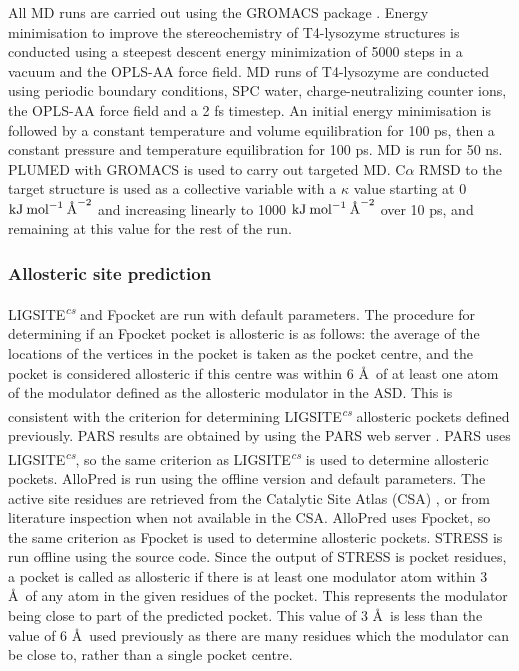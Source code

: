 All MD runs are carried out using the GROMACS package \cite{Abraham2015}.
Energy minimisation to improve the stereochemistry of T4-lysozyme structures is conducted using a steepest descent energy minimization of 5000 steps in a vacuum and the OPLS-AA force field.
MD runs of T4-lysozyme are conducted using periodic boundary conditions, SPC water, charge-neutralizing counter ions, the OPLS-AA force field and a 2 fs timestep.
An initial energy minimisation is followed by a constant temperature and volume equilibration for 100 ps, then a constant pressure and temperature equilibration for 100 ps.
MD is run for 50 ns.
PLUMED \cite{Tribello2014} with GROMACS is used to carry out targeted MD.
C$\alpha$ RMSD to the target structure is used as a collective variable with a $\kappa$ value starting at 0 $\textup{kJ} \: \textup{mol}^{-1} \: \textup{\AA}^{-2}$ and increasing linearly to 1000 $\textup{kJ} \: \textup{mol}^{-1} \: \textup{\AA}^{-2}$ over 10 ps, and remaining at this value for the rest of the run.


\subsubsection{Allosteric site prediction}

LIGSITE\textsuperscript{\it cs} \cite{Huang2006} and Fpocket \cite{LeGuilloux2009} are run with default parameters.
The procedure for determining if an Fpocket pocket is allosteric is as follows: the average of the locations of the vertices in the pocket is taken as the pocket centre, and the pocket is considered allosteric if this centre was within 6 \AA\ of at least one atom of the modulator defined as the allosteric modulator in the ASD.
This is consistent with the criterion for determining LIGSITE\textsuperscript{\it cs} allosteric pockets defined previously.
PARS results are obtained by using the PARS web server \cite{Panjkovich2014}.
PARS uses LIGSITE\textsuperscript{\it cs}, so the same criterion as LIGSITE\textsuperscript{\it cs} is used to determine allosteric pockets.
AlloPred is run using the offline version \cite{Greener2015} and default parameters.
The active site residues are retrieved from the Catalytic Site Atlas (CSA) \cite{Furnham2014}, or from literature inspection when not available in the CSA.
AlloPred uses Fpocket, so the same criterion as Fpocket is used to determine allosteric pockets.
STRESS \cite{Clarke2016} is run offline using the source code.
Since the output of STRESS is pocket residues, a pocket is called as allosteric if there is at least one modulator atom within 3 \AA\ of any atom in the given residues of the pocket.
This represents the modulator being close to part of the predicted pocket.
This value of 3 \AA\ is less than the value of 6 \AA\ used previously as there are many residues which the modulator can be close to, rather than a single pocket centre.


